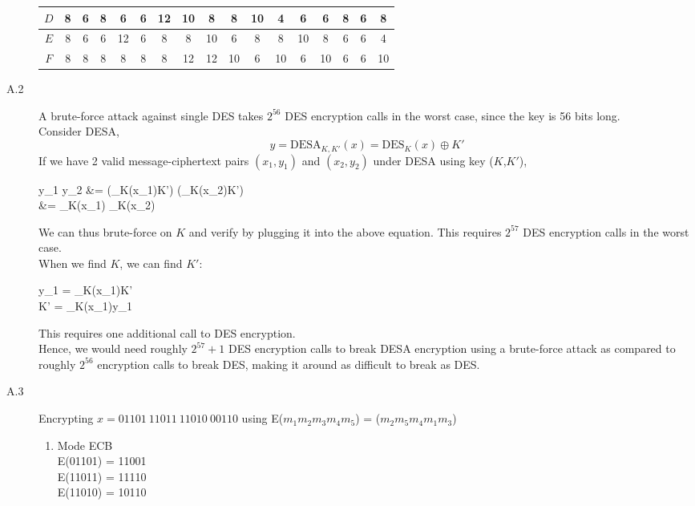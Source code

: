 \documentclass{article}
\begin{document}
\begin{description}[leftmargin=3pt]
\begin{framed}
\begin{description}
\begin{center}
\begin{tabular}{|c||c|c|c|c|c|c|c|c|c|c|c|c|c|c|c|c|}
					\hline $D$ & 8 & 6 & 8 & 6 & 6 & 12 & 10 & 8 & 8 & 10 & 4 & 6 & 6 & 8 & 6 & 8\\
					\hline $E$ & 8 & 6 & 6 & 12 & 6 & 8 & 8 & 10 & 6 & 8 & 8 & 10 & 8 & 6 & 6 & 4\\
					\hline $F$ & 8 & 8 & 8 & 8 & 8 & 8 & 12 & 12 & 10 & 6 & 10 & 6 & 10 & 6 & 6 & 10\\
					\hline
				\end{tabular}
			\end{center}
			\item[A.2] A brute-force attack against single DES takes $2^{56}$ DES encryption calls in the worst case, since the key is 56 bits long.\\
			Consider DESA, 
			\begin{equation*}
				y = \text{DESA}_{K,K'}(x) = \text{DES}_K(x)\oplus K'
			\end{equation*}
			If we have 2 valid message-ciphertext pairs $(x_1, y_1)$ and $(x_2, y_2)$ under DESA using key ($K$,$K'$),
			\begin{flalign*}
				y_1 \oplus y_2 &= (_K(x_1)\oplus K') \oplus (_K(x_2)\oplus K')\\
				&= _K(x_1) \oplus {}_K(x_2)
			\end{flalign*}
			We can thus brute-force on $K$ and verify by plugging it into the above equation. This requires $2^{57}$ DES encryption calls in the worst case.\\
			When we find $K$, we can find $K'$:
			\begin{flalign*}
				y_1 = _K(x_1)\oplus K'\\
				\Rightarrow K' = _K(x_1)\oplus y_1
			\end{flalign*}
			This requires one additional call to DES encryption.\\
			Hence, we would need roughly {\color{blue}$2^{57} + 1$ DES encryption calls} to break DESA encryption using a brute-force attack as compared to roughly {\color{blue}$2^{56}$ encryption calls} to break DES, making it around as difficult to break as DES.
			\item[A.3] Encrypting $x = 01101\ 11011\ 11010\ 00110$ using E($m_1m_2m_3m_4m_5$) = ($m_2m_5m_4m_1m_3$)
			\begin{enumerate}
				\item Mode ECB\\
				E(01101) = 11001\\
				E(11011) = 11110\\
				E(11010) = 10110\\

\end{enumerate}
\end{description}
\end{framed}
\end{description}
\end{document}
